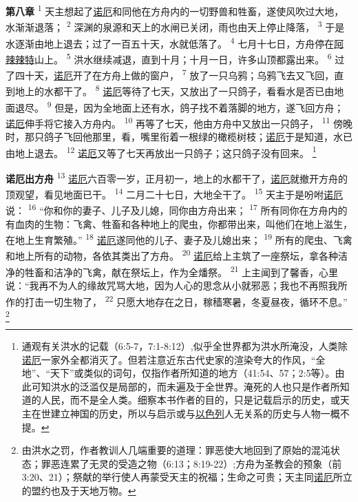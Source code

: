 \textbf{第八章\quad}
\textsuperscript{1}
天主想起了\uline{诺厄}和同他在方舟内的一切野兽和牲畜，遂使风吹过大地，水渐渐退落；
\textsuperscript{2}
深渊的泉源和天上的水闸已关闭，雨也由天上停止降落，
\textsuperscript{3}
于是水逐渐由地上退去；过了一百五十天，水就低落了。
\textsuperscript{4}
七月十七日，方舟停在\uline{阿辣}\uline{辣特}山上。
\textsuperscript{5}
洪水继续减退，直到十月；十月一日，许多山顶都露出来。
\textsuperscript{6}
过了四十天，\uline{诺厄}开了在方舟上做的窗户，
\textsuperscript{7}
放了一只乌鸦；乌鸦飞去又飞回，直到地上的水都干了。
\textsuperscript{8}
\uline{诺厄}等待了七天，又放出了一只鸽子，看看水是否已由地面退尽。
\textsuperscript{9}
但是，因为全地面上还有水，鸽子找不着落脚的地方，遂飞回方舟；\uline{诺厄}伸手将它接入方舟内。
\textsuperscript{10}
再等了七天，他由方舟中又放出一只鸽子，
\textsuperscript{11}
傍晚时，那只鸽子飞回他那里，看，嘴里衔着一根绿的橄榄树枝；\uline{诺厄}于是知道，水已由地上退去。
\textsuperscript{12}
\uline{诺厄}又等了七天再放出一只鸽子；这只鸽子没有回来。
\footnote{通观有关洪水的记载（6:5-7，7:1-8:12）,似乎全世界都为洪水所淹没，人类除\uline{诺厄}一家外全都消灭了。但若注意近东古代史家的渲染夸大的作风，“全地”、“天下”或类似的词句，仅指作者所知道的地方（41:54、57；2:5等）。由此可知洪水的泛滥仅是局部的，而未遍及于全世界。淹死的人也只是作者所知道的人民，而不是全人类。细察本书作者的目的，只是记载启示的历史，或天主在世建立神国的历史，所以与启示或与\uline{以色列}人无关系的历史与人物一概不提。}

\textbf{诺厄出方舟\quad}
\textsuperscript{13}
\uline{诺厄}六百零一岁，正月初一，地上的水都干了，\uline{诺厄}就撤开方舟的顶观望，看见地面已干。
\textsuperscript{14}
二月二十七日，大地全干了。
\textsuperscript{15}
天主于是吩咐\uline{诺厄}说：
\textsuperscript{16}
“你和你的妻子、儿子及儿媳，同你由方舟出来；
\textsuperscript{17}
所有同你在方舟内的有血肉的生物：飞禽、牲畜和各种地上的爬虫，你都带出来，叫他们在地上滋生，在地上生育繁殖。”
\textsuperscript{18}
\uline{诺厄}遂同他的儿子、妻子及儿媳出来；
\textsuperscript{19}
所有的爬虫、飞禽和地上所有的动物，各依其类出了方舟。
\textsuperscript{20}
\uline{诺厄}给上主筑了一座祭坛，拿各种洁净的牲畜和洁净的飞禽，献在祭坛上，作为全燔祭。
\textsuperscript{21}
上主闻到了馨香，心里说：“我再不为人的缘故咒骂大地，因为人心的思念从小就邪恶；我也不再照我所作的打击一切生物了，
\textsuperscript{22}
只愿大地存在之日，稼穑寒暑，冬夏昼夜，循环不息。”
\footnote{由洪水之罚，作者教训人几端重要的道理：罪恶使大地回到了原始的混沌状态；罪恶连累了无灵的受造之物（6:13；8:19-22）;方舟为圣教会的预象（前3:20、21）；祭献的举行使人再蒙受天主的祝福；生命之可贵；天主同\uline{诺厄}所立的盟约也及于天地万物。}

